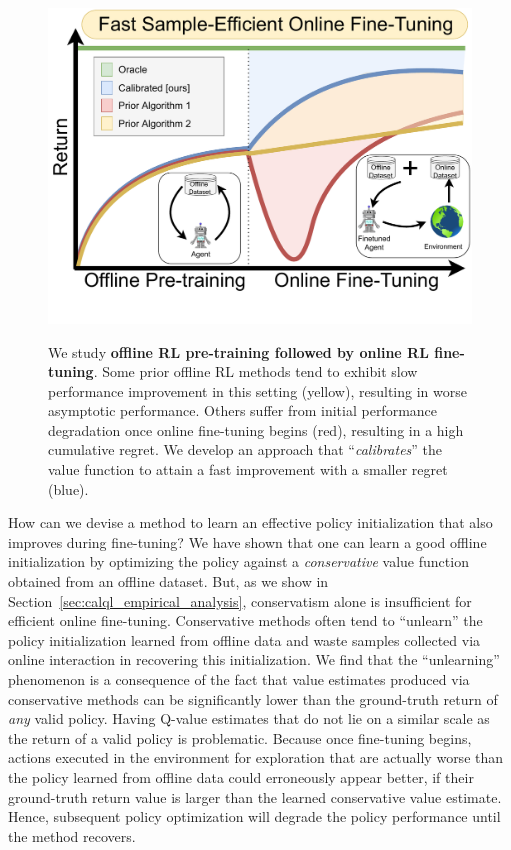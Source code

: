 \begin{figure}
    \vspace{-0.3cm}
    \begin{center}
    {\includegraphics[width=0.85\linewidth]{chapters/cal_ql/figs-sample/Teaser_V2.pdf}}
    \vspace{-0.4cm}
    \caption{
    \footnotesize{We study \textbf{offline RL pre-training followed by online RL fine-tuning}. Some prior offline RL methods tend to exhibit slow performance improvement in this setting (yellow), resulting in worse asymptotic performance. Others suffer from initial performance degradation once online fine-tuning begins (red), resulting in a high cumulative regret. We develop an approach that ``\emph{calibrates}'' the value function to attain a fast improvement with a smaller regret (blue).}}
    \vspace{-0.7cm}
    \label{fig:teaser}
    \end{center}
\end{figure}
How can we devise a method to learn an effective policy initialization that also improves during fine-tuning? We have shown that one can learn a good offline initialization by optimizing the policy against a \emph{conservative} value function obtained from an offline dataset. But, as we show in Section~\ref{sec:calql_empirical_analysis}, conservatism alone is insufficient for efficient online fine-tuning. Conservative methods often tend to ``unlearn'' the policy initialization learned from offline data and waste samples collected via online interaction in recovering this initialization. We find that the ``unlearning'' phenomenon is a consequence of the fact that value estimates produced via conservative methods can be significantly lower than the ground-truth return of \emph{any} valid policy. Having Q-value estimates that do not lie on a similar scale as the return of a valid policy is problematic. Because once fine-tuning begins, actions executed in the environment for exploration that are actually worse than the policy learned from offline data could erroneously appear better, if their ground-truth return value is larger than the learned conservative value estimate. Hence, subsequent policy optimization will degrade the policy performance until the method recovers.  

